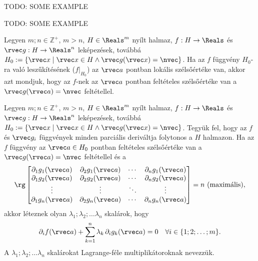 \begin{example}
  TODO: SOME EXAMPLE

  \vspace{22em}

  TODO: SOME EXAMPLE
\end{example}

\begin{definition}
  Legyen $m;n \in \mathbb Z^+$, $m > n$, $H \in \Reals^m$ nyílt halmaz,
  $f: H \to \Reals$ és $\rvec g : H \to \Reals^n$ leképezések, továbbá
  $H_0 := \{ \rvec x \mid \rvec x \in H \land \rvec g (\rvec x) = \nvec\}$.
  Ha az $f$ függvény $H_0$-ra való leszűkítésének ($f|_{H_0}$) az
  $\rvec a$ pontban lokális szélsőértéke van, akkor azt mondjuk, hogy az $f$-nek
  az $\rvec a$ pontban feltételes szélsőértéke van a $\rvec g(\rvec a) = \nvec$
  feltétellel.
\end{definition}

\begin{definition}
  Legyen $m;n \in \mathbb Z^+$, $m > n$, $H \in \Reals^m$ nyílt halmaz,
  $f: H \to \Reals$ és $\rvec g : H \to \Reals^n$ leképezések, továbbá
  $H_0 := \{ \rvec x \mid \rvec x \in H \land \rvec g (\rvec x) = \nvec\}$.
  Tegyük fel, hogy az $f$ és $\rvec g_i$ függvények minden parciális deriváltja
  folytonos a $H$ halmazon. Ha az $f$ függvény az $\rvec a \in H_0$ pontban
  feltételes szélsőértéke van a $\rvec g(\rvec a) = \nvec$ feltétellel és a
  \def\arraystretch{1.5}
  $$
    \rg \begin{bmatrix}
      \partial_1 g_1 (\rvec a) & \partial_2 g_1 (\rvec a) & \cdots & \partial_n g_1 (\rvec a) \\
      \partial_1 g_2 (\rvec a) & \partial_2 g_2 (\rvec a) & \cdots & \partial_n g_2 (\rvec a) \\
      \vdots                   & \vdots                   & \ddots & \vdots                   \\
      \partial_1 g_n (\rvec a) & \partial_2 g_n (\rvec a) & \cdots & \partial_n g_n (\rvec a)
    \end{bmatrix} = n
    \text{ (maximális)},
  $$
  akkor léteznek olyan $\lambda_1; \lambda_2; \ldots \lambda_n$ skalárok, hogy
  $$
    \partial_i f(\rvec a)
    + \sum_{k = 1}^{n} \lambda_k \,\partial_i g_k(\rvec a) = 0
    \quad
    \forall i \in \{1;2;\ldots;m\}
    \text.
  $$
  A $\lambda_1; \lambda_2; \ldots \lambda_n$ skalárokat Lagrange-féle
  multiplikátoroknak nevezzük.
\end{definition}